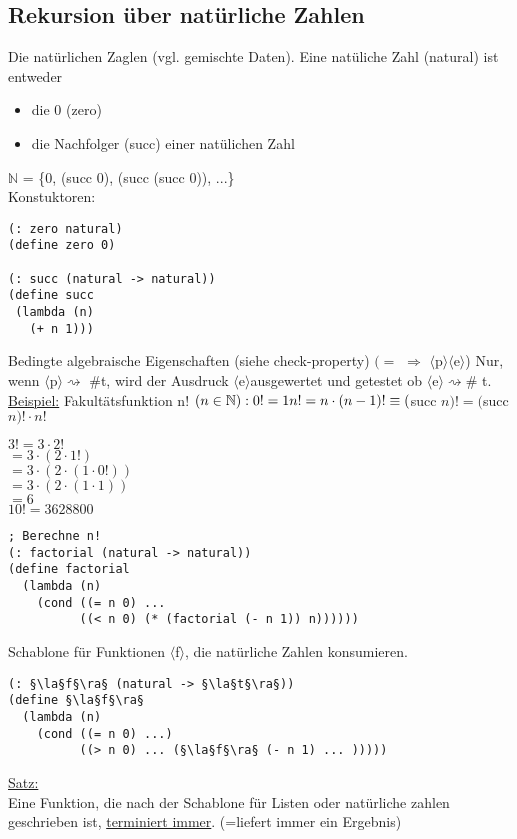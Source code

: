 \documentclass[a4paper,12pt]{article}
\newcommand{\la}{$\langle$}
\newcommand{\ra}{$\rangle$}
\begin{document}
\subsection{Rekursion über natürliche Zahlen}
Die natürlichen Zaglen (vgl. gemischte Daten).
Eine natüliche Zahl (natural) ist entweder
\begin{itemize}
\item die 0 (zero)
\item die Nachfolger (succ) einer natülichen Zahl
\end{itemize}
$\mathbb{N}$ = \{0, (succ 0), (succ (succ 0)), ...\}\\
Konstuktoren:
\begin{lstlisting}[style=customc]
(: zero natural)
(define zero 0)

(: succ (natural -> natural))
(define succ
 (lambda (n)
   (+ n 1)))
\end{lstlisting}
Bedingte algebraische Eigenschaften (siehe check-property)
$(= $ $\Rightarrow$ \la p\ra \la e\ra)
Nur, wenn \la p\ra $\rightsquigarrow$ \#t, wird der Ausdruck \la e\ra ausgewertet und getestet ob \la e\ra$\rightsquigarrow$\# t.\\
\uline{Beispiel:} Fakultätsfunktion n! $(n\in \mathbb{N}):\\
0!=1\\
n! =n \cdot (n-1)! \equiv ($succ $n)! = ($succ $n)!\cdot n!$
\begin{center}
$3! = 3 \cdot 2!$\\
$	= 3 \cdot (2 \cdot 1!)$\\
$   = 3 \cdot (2 \cdot (1 \cdot 0 !))$\\
$   = 3 \cdot (2 \cdot (1 \cdot 1))$\\
$   = 6$\\
$10!= 3628800$
\end{center}
\begin{lstlisting}[style=customc]
; Berechne n!
(: factorial (natural -> natural))
(define factorial
  (lambda (n)
    (cond ((= n 0) ...
          ((< n 0) (* (factorial (- n 1)) n))))))
\end{lstlisting}
Schablone für Funktionen \la f\ra, die natürliche Zahlen konsumieren.
\begin{lstlisting}[style=customc]
(: §\la§f§\ra§ (natural -> §\la§t§\ra§))
(define §\la§f§\ra§
  (lambda (n)
    (cond ((= n 0) ...)
		  ((> n 0) ... (§\la§f§\ra§ (- n 1) ... )))))
\end{lstlisting}
\uline{Satz:}\\
Eine Funktion, die nach der Schablone für Listen oder natürliche zahlen geschrieben ist, \uline{terminiert immer}. (=liefert immer ein Ergebnis)\\
\end{document}
